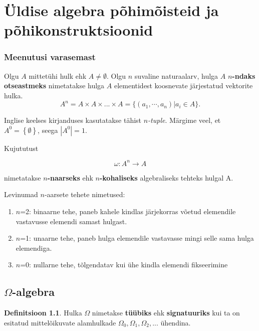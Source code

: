 \documentclass[12pt]{report}
\numberwithin{equation}{section}
\theoremstyle{definition}
\newtheorem{tyyp}[equation]{Definitsioon}
\theoremstyle{plain}
\begin{document}


\chapter{\"Uldise algebra põhimõisteid ja põhikonstruktsioonid}


\colorbox{background_example}{\parbox{\textwidth}{
\subsection*{Meenutusi varasemast}

Olgu $A$ mittet\"uhi hulk ehk $A \neq \emptyset$. Olgu $n$ suvaline naturaalarv, hulga $A$ \textbf{$n$-ndaks otseastmeks} nimetatakse hulga $A$ elementidest koosnevate järjestatud vektorite hulka.
\begin{equation*}
A^n = A \times A \times ... \times A = \{(a_1,\cdots,a_n)| a_i \in A \} \text{.}
\end{equation*}

Inglise keelses kirjanduses kasutatakse tähist \textit{$n$-tuple}. Märgime veel, et $A^0 = \left\{\emptyset \right\} $, seega $\left| A^0 \right| = 1$.

Kujututust

\begin{equation*}
\omega: A^n \to A 
\end{equation*} 

nimetatakse \textbf{$n$-naarseks} ehk \textbf{$n$-kohaliseks} algebraliseks tehteks hulgal A.




Levinumad $n$-aarsete tehete nimetused:
\begin{enumerate}
\item $n$=2: binaarne tehe, paneb kahele kindlas järjekorras võetud elemendile vastavusse elemendi samast hulgast.
\item $n$=1: unaarne tehe, paneb hulga elemendile vastavasse mingi selle sama hulga elemendiga. 
\item $n$=0: nullarne tehe, tõlgendatav kui \"uhe kindla elemendi fikseerimine
\end{enumerate}
}}
\section{$\Omega$-algebra}

\begin{tyyp} Hulka $\Omega$ nimetakse \textbf{t\"u\"ubiks} ehk \textbf{signatuuriks} kui ta on esitatud mittelõikuvate alamhulkade $\Omega_0 , \Omega_1, \Omega_2, ... $ \"uhendina.
\end{tyyp}
\end{document}
